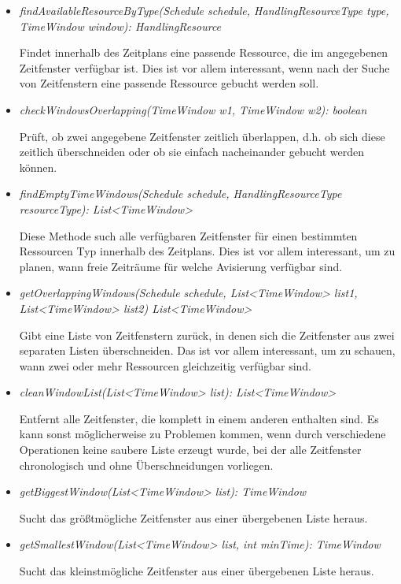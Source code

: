 \begin{itemize}
    \item \textit{findAvailableResourceByType(Schedule schedule, HandlingResourceType type, TimeWindow window): HandlingResource}

    Findet innerhalb des Zeitplans eine passende Ressource, die im angegebenen Zeitfenster verfügbar ist. Dies ist vor allem interessant, wenn nach der Suche von Zeitfenstern eine passende Ressource gebucht werden soll.    
    
    \item \textit {checkWindowsOverlapping(TimeWindow w1, TimeWindow w2): boolean}

    Prüft, ob zwei angegebene Zeitfenster zeitlich überlappen, d.h. ob sich diese zeitlich überschneiden oder ob sie einfach nacheinander gebucht werden können.
    
    \item \textit{findEmptyTimeWindows(Schedule schedule, HandlingResourceType resourceType): List<TimeWindow>}

    Diese Methode such alle verfügbaren Zeitfenster für einen bestimmten Ressourcen Typ innerhalb des Zeitplans. Dies ist vor allem interessant, um zu planen, wann freie Zeiträume für welche Avisierung verfügbar sind.
    
    \item \textit{getOverlappingWindows(Schedule schedule, List<TimeWindow> list1, List<TimeWindow> list2) List<TimeWindow>}

    Gibt eine Liste von Zeitfenstern zurück, in denen sich die Zeitfenster aus zwei separaten Listen überschneiden. Das ist vor allem interessant, um zu schauen, wann zwei oder mehr Ressourcen gleichzeitig verfügbar sind.
    
    \item \textit{cleanWindowList(List<TimeWindow> list): List<TimeWindow>}

    Entfernt alle Zeitfenster, die komplett in einem anderen enthalten sind. Es kann sonst möglicherweise zu Problemen kommen, wenn durch verschiedene Operationen keine saubere Liste erzeugt wurde, bei der alle Zeitfenster chronologisch und ohne Überschneidungen vorliegen.
    
    \item \textit{getBiggestWindow(List<TimeWindow> list): TimeWindow}

    Sucht das größtmögliche Zeitfenster aus einer übergebenen Liste heraus.
    
    \item \textit{getSmallestWindow(List<TimeWindow> list, int minTime): TimeWindow}

    Sucht das kleinstmögliche Zeitfenster aus einer übergebenen Liste heraus.
\end{itemize}

